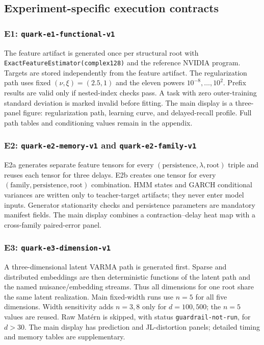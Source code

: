 \subsection{Experiment-specific execution contracts}
\label{app:experiment-contracts}

\subsubsection{E1: \texttt{quark-e1-functional-v1}}
The feature artifact is generated once per structural root with
\texttt{ExactFeatureEstimator(complex128)} and the reference NVIDIA program.
Targets are stored independently from the feature artifact.  The regularization
path uses fixed \((\nu,\xi)=(2.5,1)\) and the eleven powers
\(10^{-8},\ldots,10^2\).  Prefix results are valid only if nested-index checks
pass.  A task with zero outer-training standard deviation is marked invalid
before fitting.  The main display is a three-panel figure: regularization path,
learning curve, and delayed-recall profile.  Full path tables and conditioning
values remain in the appendix.

\subsubsection{E2: \texttt{quark-e2-memory-v1} and
\texttt{quark-e2-family-v1}}
E2a generates separate feature tensors for every
\((\text{persistence},\lambda,\text{root})\) triple and reuses each tensor for
three delays.  E2b creates one tensor for every
\((\text{family},\text{persistence},\text{root})\) combination.  HMM states and
GARCH conditional variances are written only to teacher-target artifacts; they
never enter model inputs.  Generator stationarity checks and persistence
parameters are mandatory manifest fields.  The main display combines a
contraction--delay heat map with a cross-family paired-error panel.

\subsubsection{E3: \texttt{quark-e3-dimension-v1}}
A three-dimensional latent VARMA path is generated first.  Sparse and
distributed embeddings are then deterministic functions of the latent path and
the named nuisance/embedding streams.  Thus all dimensions for one root share
the same latent realization.  Main fixed-width runs use \(n=5\) for all five
dimensions.  Width sensitivity adds \(n=3,8\) only for \(d=100,500\); the
\(n=5\) values are reused.  Raw Mat\'ern is skipped, with status
\texttt{guardrail-not-run}, for \(d>30\).  The main display has prediction and
JL-distortion panels; detailed timing and memory tables are supplementary.

